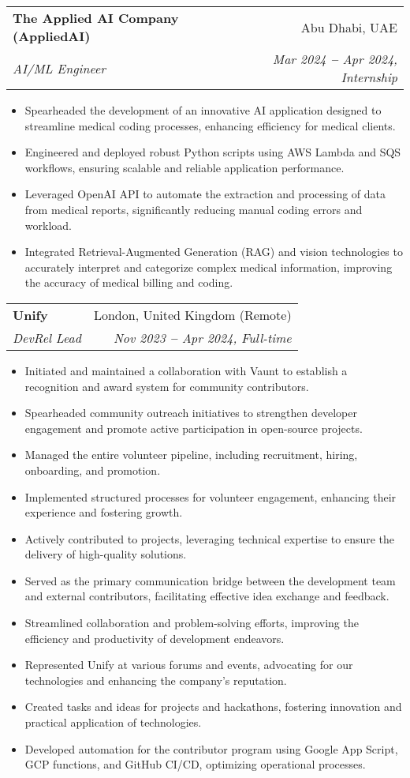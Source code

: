 \documentclass[letterpaper,11pt]{article}
\makeatletter
\newcommand{\resumeItem}[1]{
  \item\small{
    {#1 \vspace{-2pt}}
  }
}
\newcommand{\resumeSubheading}[4]{
  \vspace{-2pt}\item
    \begin{tabular*}{0.97\textwidth}[t]{l@{\extracolsep{\fill}}r}
      \textbf{#1} & #2 \\
      \textit{\small#3} & \textit{\small #4} \\
    \end{tabular*}\vspace{-7pt}
}
\newcommand{\resumeItemListStart}{\begin{itemize}}
\newcommand{\resumeItemListEnd}{\end{itemize}\vspace{-5pt}}
\makeatother
\begin{document}
        \vspace{20pt}

    \resumeSubheading
      {The Applied AI Company (AppliedAI)}{Abu Dhabi, UAE}
      {AI/ML Engineer}{Mar 2024 \textbf{--} Apr 2024, Internship}
        \resumeItemListStart
            \resumeItem{Spearheaded the development of an innovative AI application designed to streamline medical coding processes, enhancing efficiency for medical clients.}
            \resumeItem{Engineered and deployed robust Python scripts using AWS Lambda and SQS workflows, ensuring scalable and reliable application performance.}
            \resumeItem{Leveraged OpenAI API to automate the extraction and processing of data from medical reports, significantly reducing manual coding errors and workload.}
            \resumeItem{Integrated Retrieval-Augmented Generation (RAG) and vision technologies to accurately interpret and categorize complex medical information, improving the accuracy of medical billing and coding.}
        \resumeItemListEnd

        \vspace{20pt}
        \resumeSubheading
        {Unify}{London, United Kingdom (Remote)}
        {DevRel Lead}{Nov 2023 \textbf{--} Apr 2024, Full-time}
          \resumeItemListStart
              \resumeItem{Initiated and maintained a collaboration with Vaunt to establish a recognition and award system for community contributors.}
              \resumeItem{Spearheaded community outreach initiatives to strengthen developer engagement and promote active participation in open-source projects.}
              \resumeItem{Managed the entire volunteer pipeline, including recruitment, hiring, onboarding, and promotion.}
              \resumeItem{Implemented structured processes for volunteer engagement, enhancing their experience and fostering growth.}
              \resumeItem{Actively contributed to projects, leveraging technical expertise to ensure the delivery of high-quality solutions.}
              \resumeItem{Served as the primary communication bridge between the development team and external contributors, facilitating effective idea exchange and feedback.}
              \resumeItem{Streamlined collaboration and problem-solving efforts, improving the efficiency and productivity of development endeavors.}
              \resumeItem{Represented Unify at various forums and events, advocating for our technologies and enhancing the company's reputation.}
              \resumeItem{Created tasks and ideas for projects and hackathons, fostering innovation and practical application of technologies.}
              \resumeItem{Developed automation for the contributor program using Google App Script, GCP functions, and GitHub CI/CD, optimizing operational processes.}
          \resumeItemListEnd      
\end{document}
